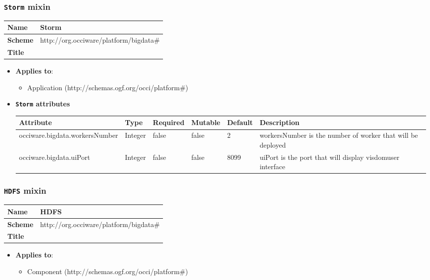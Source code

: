 \subsubsection{\texttt{Storm} mixin}
\begin{center}
\begin{tabular}{|l|l|}
  \hline
  \textbf{Name} & Storm \\
  \hline  
  \textbf{Scheme} & http://org.occiware/platform/bigdata\# \\
  \hline
  \textbf{Title} &  \\
  \hline
\end{tabular}
\end{center}
\begin{itemize}
\item \textbf{Applies to}:
\begin{itemize}
	\item Application (http://schemas.ogf.org/occi/platform\#)
\end{itemize}
\end{itemize} 

\begin{itemize}
\item \textbf{\texttt{Storm} attributes}

\begin{tabularx}{\textwidth}{|l|l|p{1.4cm}|p{1.3cm}|l|X|}
  \hline
  \textbf{Attribute} & \textbf{Type} & \textbf{Required} & \textbf{Mutable} & \textbf{Default} & \textbf{Description} \\
  \hline  
  occiware.bigdata.workersNumber & Integer & false & false & 2 & workersNumber is the number of worker that will be deployed \\
  \hline
  occiware.bigdata.uiPort & Integer & false & false & 8099 & uiPort is the port that will display visdomuser interface  \\
  \hline
\end{tabularx}
\end{itemize}


 
\subsubsection{\texttt{HDFS} mixin}
\begin{center}
\begin{tabular}{|l|l|}
  \hline
  \textbf{Name} & HDFS \\
  \hline  
  \textbf{Scheme} & http://org.occiware/platform/bigdata\# \\
  \hline
  \textbf{Title} &  \\
  \hline
\end{tabular}
\end{center}
\begin{itemize}
\item \textbf{Applies to}:
\begin{itemize}
	\item Component (http://schemas.ogf.org/occi/platform\#)
\end{itemize}
\end{itemize} 

